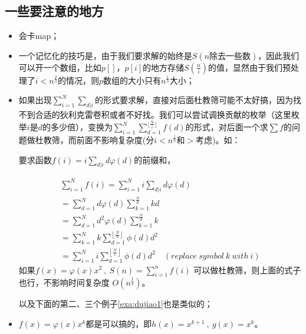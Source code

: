 \subsection{一些要注意的地方}
\begin{itemize}
\item 会卡map；
\item 一个记忆化的技巧是，由于我们要求解的始终是$S(n除去一些数)$，因此我们可以开一个数组，比如$p[]$，$p[i]$的地方存储$S(\frac{n}{i})$的值，显然由于我们预处理了$i<n^{\frac{2}{3}}$的情况，则$p$数组的大小只有$n^{\frac{1}{3}}$大小；
\item 如果出现$\sum_{i=1}^N\sum_{d|i}$的形式要求解，直接对后面杜教筛可能不太好搞，因为找不到合适的狄利克雷卷积或者不好找。我们可以尝试调换贡献的枚举（这里枚举$i$是$d$的多少倍），变换为$\sum_{i=1}^N\sum_{d=1}^{\lfloor \frac N i \rfloor}f(d)$的形式，对后面一个求$\sum f$的问题做杜教筛，而前面不影响复杂度(分$i<n^{\frac 1 3}$和$>$考虑)。如：

\qquad 要求函数$f(i) = i \sum_{d | i} d \varphi(d)$的前缀和，

$$
\begin{array}{l}{\sum_{i=1}^{N} f(i)=\sum_{i=1}^{N} i \sum_{d | i} d \varphi(d)} \\ {=\sum_{d=1}^{N} d \varphi(d) \sum_{k=1}^{\frac{N}{d}} k d} \\ {=\sum_{d=1}^{N} d^{2} \varphi(d) \sum_{k=1}^{\frac{N}{d}} k} \\ {=\sum_{k=1}^{N} k \sum_{d=1}^{\left\lfloor\frac{N}{k}\right\rfloor} \phi(d) d^{2}} \\ {=\sum_{i=1}^{N} i \sum_{d=1}^{\left\lfloor\frac{N}{i}\right\rfloor} \phi(d) d^{2} \quad \left( replace\ symbol\ k\ with\ i\right)}  \end{array}
$$ 
如果$f(x)=\varphi(x)x^2\ ,\ S(n)=\sum_{i=1}^nf(i)$  可以做杜教筛，则上面的式子也行，不影响时间复杂度 $O(n^{\frac 2 3})$。

以及下面的第二、三个例子\ref{exa:dujiao1}也是类似的；
\item $f(x)=\varphi(x)x^k$都是可以搞的，即$h(x)=x^{k+1}\ ,\ g(x)=x^k$。
\end{itemize}

